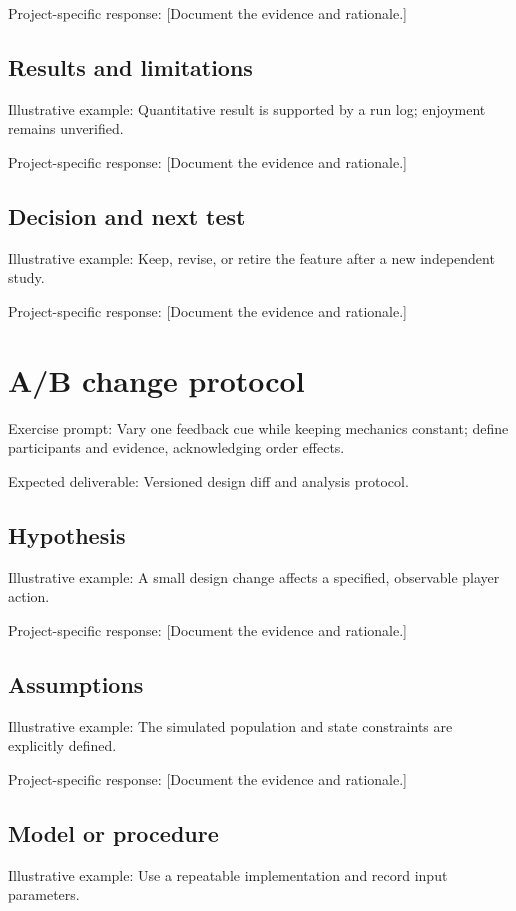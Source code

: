 \documentclass[11pt]{article}
\begin{document}
Project-specific response: [Document the evidence and rationale.]


\subsection{Results and limitations}
Illustrative example: Quantitative result is supported by a run log; enjoyment remains unverified.

Project-specific response: [Document the evidence and rationale.]


\subsection{Decision and next test}
Illustrative example: Keep, revise, or retire the feature after a new independent study.

Project-specific response: [Document the evidence and rationale.]


\section{A/B change protocol}
Exercise prompt: Vary one feedback cue while keeping mechanics constant; define participants and evidence, acknowledging order effects.

Expected deliverable: Versioned design diff and analysis protocol.


\subsection{Hypothesis}
Illustrative example: A small design change affects a specified, observable player action.

Project-specific response: [Document the evidence and rationale.]


\subsection{Assumptions}
Illustrative example: The simulated population and state constraints are explicitly defined.

Project-specific response: [Document the evidence and rationale.]


\subsection{Model or procedure}
Illustrative example: Use a repeatable implementation and record input parameters.
\end{document}

